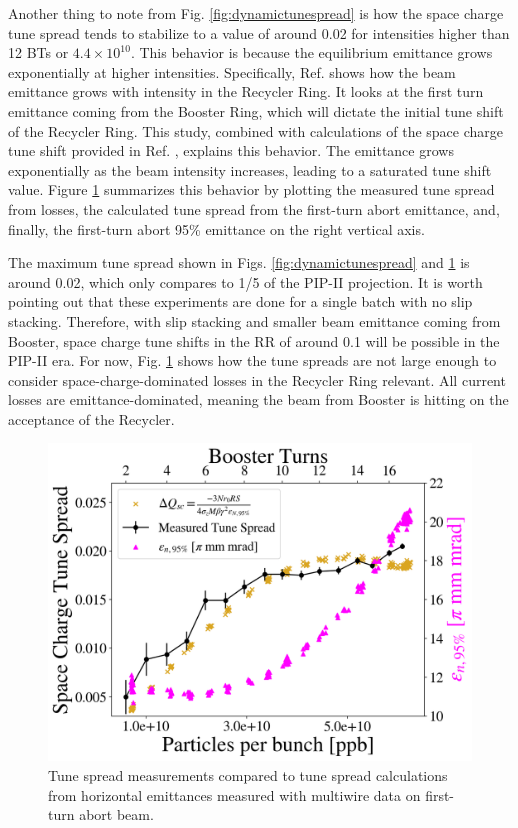 Another thing to note from Fig. \ref{fig:dynamictunespread} is how the space charge tune spread tends to stabilize to a value of around 0.02 for intensities higher than 12 BTs or $4.4\times 10^{10}$. This behavior is because the equilibrium emittance grows exponentially at higher intensities. Specifically, Ref. \cite{betiay} shows how the beam emittance grows with intensity in the Recycler Ring. It looks at the first turn emittance coming from the Booster Ring, which will dictate the initial tune shift of the Recycler Ring. This study, combined with calculations of the space charge tune shift provided in Ref. \cite{zhang}, explains this behavior. The emittance grows exponentially as the beam intensity increases, leading to a saturated tune shift value. Figure \ref{fig:tunespread} summarizes this behavior by plotting the measured tune spread from losses, the calculated tune spread from the first-turn abort emittance, and, finally, the first-turn abort 95\% emittance on the right vertical axis.   

The maximum tune spread shown in Figs. \ref{fig:dynamictunespread} and \ref{fig:tunespread} is around 0.02, which only compares to 1/5 of the PIP-II projection. It is worth pointing out that these experiments are done for a single batch with no slip stacking. Therefore, with slip stacking and smaller beam emittance coming from Booster, space charge tune shifts in the RR of around 0.1 will be possible in the PIP-II era. For now, Fig. \ref{fig:tunespread} shows how the tune spreads are not large enough to consider space-charge-dominated losses in the Recycler Ring relevant. All current losses are emittance-dominated, meaning the beam from Booster is hitting on the acceptance of the Recycler.  

\begin{figure}[H]
    \centering
    \includegraphics[width=\columnwidth]{chapter6/tune_spread.png}
    \caption{Tune spread measurements compared to tune spread calculations from horizontal emittances measured with multiwire data on first-turn abort beam.}
    \label{fig:tunespread}
\end{figure}

